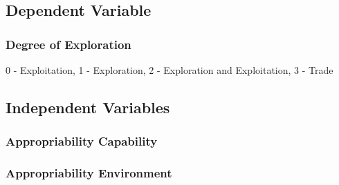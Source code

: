 \documentclass[12pt,letterpaper]{article}
\begin{document}
\subsection{Dependent Variable}

\subsubsection{Degree of Exploration} \par
0 - Exploitation, 1 - Exploration, 2 - Exploration and Exploitation, 3 - Trade \par
\subsection{Independent Variables}
\subsubsection{Appropriability Capability}

\subsubsection{Appropriability Environment}
\renewcommand{\refname}{REFERENCES}
 

\end{document}
